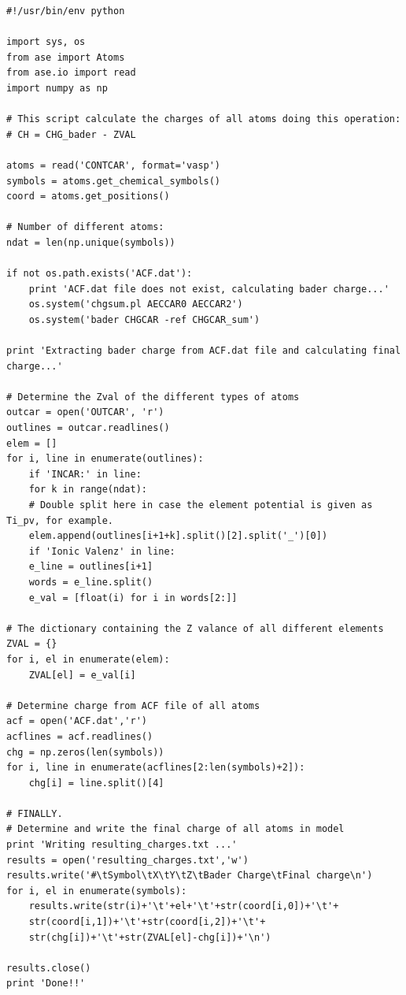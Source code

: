 \documentclass[11pt]{article}
\begin{document}
\begin{verbatim}
#!/usr/bin/env python

import sys, os
from ase import Atoms
from ase.io import read
import numpy as np

# This script calculate the charges of all atoms doing this operation:
# CH = CHG_bader - ZVAL  

atoms = read('CONTCAR', format='vasp')
symbols = atoms.get_chemical_symbols()
coord = atoms.get_positions()

# Number of different atoms:
ndat = len(np.unique(symbols))

if not os.path.exists('ACF.dat'):
    print 'ACF.dat file does not exist, calculating bader charge...'
    os.system('chgsum.pl AECCAR0 AECCAR2')
    os.system('bader CHGCAR -ref CHGCAR_sum')

print 'Extracting bader charge from ACF.dat file and calculating final charge...'

# Determine the Zval of the different types of atoms
outcar = open('OUTCAR', 'r')
outlines = outcar.readlines()
elem = []
for i, line in enumerate(outlines):
    if 'INCAR:' in line:
	for k in range(ndat):
	# Double split here in case the element potential is given as Ti_pv, for example.
	elem.append(outlines[i+1+k].split()[2].split('_')[0])
    if 'Ionic Valenz' in line:
	e_line = outlines[i+1]
	words = e_line.split()
	e_val = [float(i) for i in words[2:]]

# The dictionary containing the Z valance of all different elements
ZVAL = {}
for i, el in enumerate(elem):
    ZVAL[el] = e_val[i]

# Determine charge from ACF file of all atoms
acf = open('ACF.dat','r')
acflines = acf.readlines()
chg = np.zeros(len(symbols))
for i, line in enumerate(acflines[2:len(symbols)+2]):
    chg[i] = line.split()[4]

# FINALLY.
# Determine and write the final charge of all atoms in model
print 'Writing resulting_charges.txt ...'
results = open('resulting_charges.txt','w')
results.write('#\tSymbol\tX\tY\tZ\tBader Charge\tFinal charge\n')
for i, el in enumerate(symbols):
    results.write(str(i)+'\t'+el+'\t'+str(coord[i,0])+'\t'+
	str(coord[i,1])+'\t'+str(coord[i,2])+'\t'+
	str(chg[i])+'\t'+str(ZVAL[el]-chg[i])+'\n')

results.close()
print 'Done!!'
\end{verbatim}
\end{document}
